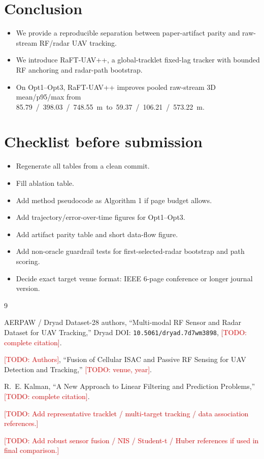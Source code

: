 \documentclass[10pt,conference]{IEEEtran}
\newcommand{\raftpp}{RaFT-UAV++\xspace}
\newcommand{\todo}[1]{\textcolor{red}{[TODO: #1]}}
\begin{document}
\section{Conclusion}
\label{sec:conclusion}

\begin{itemize}[leftmargin=*]
  \item We provide a reproducible separation between paper-artifact parity and raw-stream RF/radar UAV tracking.
  \item We introduce \raftpp, a global-tracklet fixed-lag tracker with bounded RF anchoring and radar-path bootstrap.
  \item On Opt1--Opt3, \raftpp improves pooled raw-stream 3D mean/p95/max from \SI{85.79}/\SI{398.03}/\SI{748.55}{m} to \SI{59.37}/\SI{106.21}/\SI{573.22}{m}.
\end{itemize}

\section*{Checklist before submission}
\begin{itemize}[leftmargin=*]
  \item Regenerate all tables from a clean commit.
  \item Fill ablation table.
  \item Add method pseudocode as Algorithm 1 if page budget allows.
  \item Add trajectory/error-over-time figures for Opt1--Opt3.
  \item Add artifact parity table and short data-flow figure.
  \item Add non-oracle guardrail tests for first-selected-radar bootstrap and path scoring.
  \item Decide exact target venue format: IEEE 6-page conference or longer journal version.
\end{itemize}

\begin{thebibliography}{9}

AERPAW / Dryad Dataset-28 authors,
``Multi-modal RF Sensor and Radar Dataset for UAV Tracking,''
Dryad DOI: \texttt{10.5061/dryad.7d7wm3898},
\todo{complete citation}.

\todo{Authors},
``Fusion of Cellular ISAC and Passive RF Sensing for UAV Detection and Tracking,''
\todo{venue, year}.

R.~E. Kalman,
``A New Approach to Linear Filtering and Prediction Problems,''
\todo{complete citation}.

\todo{Add representative tracklet / multi-target tracking / data association references.}

\todo{Add robust sensor fusion / NIS / Student-t / Huber references if used in final comparison.}

\end{thebibliography}
\end{document}

